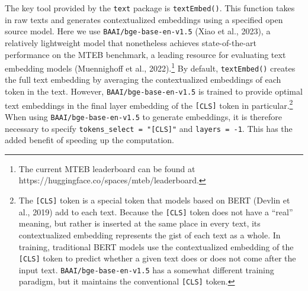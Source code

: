\documentclass[
  man,
  floatsintext,
  longtable,
  nolmodern,
  notxfonts,
  notimes,
  colorlinks=true,linkcolor=blue,citecolor=blue,urlcolor=blue]{apa7}
\newenvironment{Shaded}{\begin{snugshade}}{\end{snugshade}}
\newcommand{\AttributeTok}[1]{\textcolor[rgb]{0.40,0.45,0.13}{#1}}
\newcommand{\CommentTok}[1]{\textcolor[rgb]{0.37,0.37,0.37}{#1}}
\newcommand{\DecValTok}[1]{\textcolor[rgb]{0.68,0.00,0.00}{#1}}
\newcommand{\FunctionTok}[1]{\textcolor[rgb]{0.28,0.35,0.67}{#1}}
\newcommand{\NormalTok}[1]{\textcolor[rgb]{0.00,0.23,0.31}{#1}}
\newcommand{\OtherTok}[1]{\textcolor[rgb]{0.00,0.23,0.31}{#1}}
\newcommand{\SpecialCharTok}[1]{\textcolor[rgb]{0.37,0.37,0.37}{#1}}
\newcommand{\StringTok}[1]{\textcolor[rgb]{0.13,0.47,0.30}{#1}}
\begin{document}
The key tool provided by the \texttt{text} package is
\texttt{textEmbed()}. This function takes in raw texts and generates
contextualized embeddings using a specified open source model. Here we
use \texttt{BAAI/bge-base-en-v1.5} (Xiao et al., 2023), a relatively
lightweight model that nonetheless achieves state-of-the-art performance
on the MTEB benchmark, a leading resource for evaluating text embedding
models (Muennighoff et al., 2022).\footnote{The current MTEB leaderboard
  can be found at https://huggingface.co/spaces/mteb/leaderboard.} By
default, \texttt{textEmbed()} creates the full text embedding by
averaging the contextualized embeddings of each token in the text.
However, \texttt{BAAI/bge-base-en-v1.5} is trained to provide optimal
text embeddings in the final layer embedding of the \texttt{{[}CLS{]}}
token in particular.\footnote{The \texttt{{[}CLS{]}} token is a special
  token that models based on BERT (Devlin et al., 2019) add to each
  text. Because the \texttt{{[}CLS{]}} token does not have a ``real''
  meaning, but rather is inserted at the same place in every text, its
  contextualized embedding represents the gist of each text as a whole.
  In training, traditional BERT models use the contextualized embedding
  of the \texttt{{[}CLS{]}} token to predict whether a given text does
  or does not come after the input text. \texttt{BAAI/bge-base-en-v1.5}
  has a somewhat different training paradigm, but it maintains the
  conventional \texttt{{[}CLS{]}} token.} When using
\texttt{BAAI/bge-base-en-v1.5} to generate embeddings, it is therefore
necessary to specify \texttt{tokens\_select\ =\ "{[}CLS{]}"} and
\texttt{layers\ =\ -1}. This has the added benefit of speeding up the
computation.

\begin{Shaded}
\end{Shaded}
\end{document}
